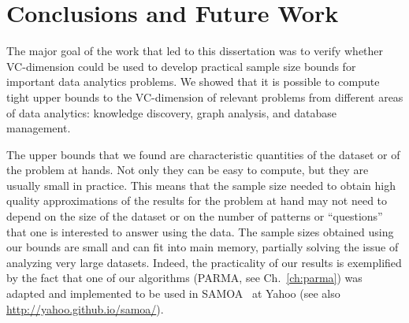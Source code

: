 \chapter{Conclusions and Future Work}\label{ch:conclusions}

The major goal of the work that led to this dissertation was to verify whether
VC-dimension could be used to develop practical sample size bounds for important
data analytics problems. We showed that it is possible to compute tight upper
bounds to the VC-dimension of relevant problems from different areas of data
analytics: knowledge discovery, graph analysis, and database management. 

The upper bounds that we found are characteristic quantities of the dataset or of the
problem at hands. Not only they can be easy to compute, but they are usually
small in practice. This means that the sample size needed to obtain high quality
approximations of the results for the problem at hand may not need to depend on
the size of the dataset or on the number of patterns or ``questions'' that one
is interested to answer using the data. The sample sizes obtained using our
bounds are small and can fit into main memory, partially solving the issue of
analyzing very large datasets. Indeed, the practicality of our results is
exemplified by the fact that one of our algorithms (PARMA, see
Ch.~\ref{ch:parma}) was adapted and implemented to be used in
SAMOA~\citep{DFMorales13} at Yahoo (see also \url{http://yahoo.github.io/samoa/}).

